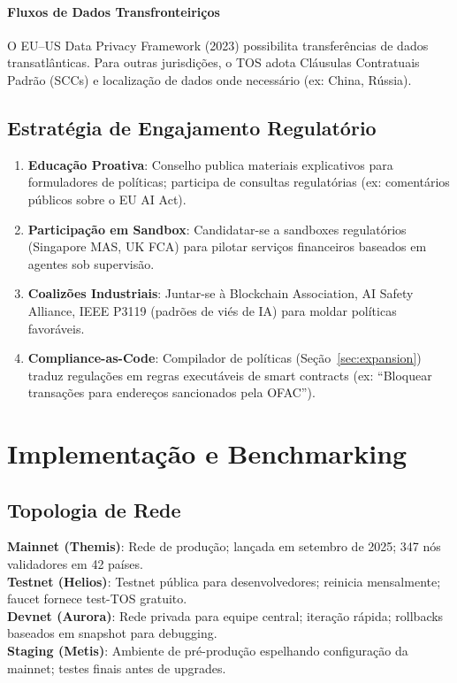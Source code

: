 \documentclass[11pt]{article}
\begin{document}
\begin{itemize}[noitemsep]
\begin{itemize}[noitemsep]
\begin{itemize}[noitemsep]
\paragraph{Fluxos de Dados Transfronteiriços}
O EU--US Data Privacy Framework (2023) possibilita transferências de dados transatlânticas. Para outras jurisdições, o TOS adota Cláusulas Contratuais Padrão (SCCs) e localização de dados onde necessário (ex: China, Rússia).

\subsection{Estratégia de Engajamento Regulatório}

\begin{enumerate}[noitemsep]
  \item \textbf{Educação Proativa}: Conselho publica materiais explicativos para formuladores de políticas; participa de consultas regulatórias (ex: comentários públicos sobre o EU AI Act).
  \item \textbf{Participação em Sandbox}: Candidatar-se a sandboxes regulatórios (Singapore MAS, UK FCA) para pilotar serviços financeiros baseados em agentes sob supervisão.
  \item \textbf{Coalizões Industriais}: Juntar-se à Blockchain Association, AI Safety Alliance, IEEE P3119 (padrões de viés de IA) para moldar políticas favoráveis.
  \item \textbf{Compliance-as-Code}: Compilador de políticas (Seção~\ref{sec:expansion}) traduz regulações em regras executáveis de smart contracts (ex: ``Bloquear transações para endereços sancionados pela OFAC'').
\end{enumerate}

\section{Implementação e Benchmarking}
\label{sec:implementation}

\subsection{Topologia de Rede}

\textbf{Mainnet (Themis)}: Rede de produção; lançada em setembro de 2025; 347 nós validadores em 42 países.\\
\textbf{Testnet (Helios)}: Testnet pública para desenvolvedores; reinicia mensalmente; faucet fornece test-TOS gratuito.\\
\textbf{Devnet (Aurora)}: Rede privada para equipe central; iteração rápida; rollbacks baseados em snapshot para debugging.\\
\textbf{Staging (Metis)}: Ambiente de pré-produção espelhando configuração da mainnet; testes finais antes de upgrades.


\end{itemize}
\end{itemize}
\end{itemize}
\end{document}
